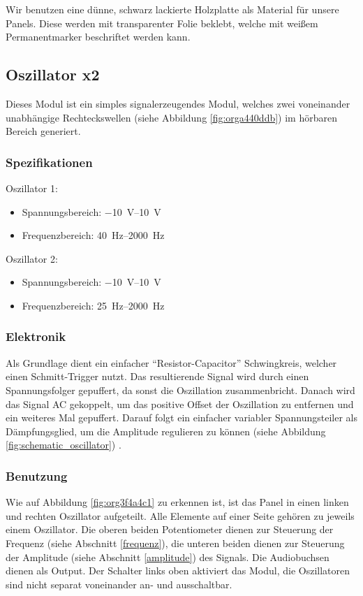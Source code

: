 Wir benutzen eine dünne, schwarz lackierte Holzplatte als Material für unsere Panels. Diese werden mit transparenter Folie beklebt, welche mit weißem Permanentmarker beschriftet werden kann.
\subsection{Oszillator x2 \label{Osci}}
\label{sec:orgc8dc7d3}
Dieses Modul ist ein simples signalerzeugendes Modul, welches zwei voneinander unabhängige Rechteckswellen (siehe Abbildung \ref{fig:orga440ddb}) im hörbaren Bereich generiert.

\subsubsection{Spezifikationen}
\label{sec:org1fbe24b}
Oszillator 1:
\begin{itemize}
\item Spannungsbereich: \SIrange{-10}{+10}{\volt}
\item Frequenzbereich: \SIrange{40}{2000}{\hertz}
\end{itemize}

Oszillator 2:
\begin{itemize}
\item Spannungsbereich: \SIrange{-10}{+10}{\volt}
\item Frequenzbereich: \SIrange{25}{2000}{\hertz}
\end{itemize}

\subsubsection{Elektronik}
\label{sec:org852be34}
Als Grundlage dient ein einfacher "`Resistor-Capacitor"' Schwingkreis, welcher einen Schmitt-Trigger nutzt. Das resultierende Signal wird durch einen Spannungsfolger gepuffert, da sonst die Oszillation zusammenbricht. Danach wird das Signal AC gekoppelt, um das positive Offset der Oszillation zu entfernen und ein weiteres Mal gepuffert. Darauf folgt ein einfacher variabler Spannungsteiler als Dämpfungsglied, um die Amplitude regulieren zu können (siehe Abbildung \ref{fig:schematic_oscillator}) \cite{klein:osci}. 

\subsubsection{Benutzung}
\label{sec:org87bf130}
Wie auf Abbildung \ref{fig:org3f4a4c1} zu erkennen ist, ist das Panel in einen linken und rechten Oszillator aufgeteilt. Alle Elemente auf einer Seite gehören zu jeweils einem Oszillator. Die oberen beiden Potentiometer dienen zur Steuerung der Frequenz (siehe Abschnitt \ref{frequenz}), die unteren beiden dienen zur Steuerung der Amplitude (siehe Abschnitt \ref{amplitude}) des Signals. Die Audiobuchsen dienen als Output. Der Schalter links oben aktiviert das Modul, die Oszillatoren sind nicht separat voneinander an- und ausschaltbar.


